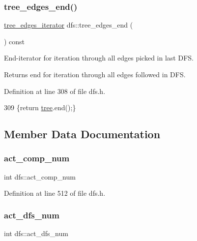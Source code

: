 \subsubsection{\texorpdfstring{tree\+\_\+edges\+\_\+end()}{tree\_edges\_end()}}
{\footnotesize\ttfamily \mbox{\hyperlink{classdfs_accde8d5403404f6d22fe4756d4ffedd5}{tree\+\_\+edges\+\_\+iterator}} dfs\+::tree\+\_\+edges\+\_\+end (\begin{DoxyParamCaption}{ }\end{DoxyParamCaption}) const\hspace{0.3cm}{\ttfamily [inline]}}



End-\/iterator for iteration through all edges picked in last D\+FS. 

\begin{DoxyReturn}{Returns}
end for iteration through all edges followed in D\+FS. 
\end{DoxyReturn}


Definition at line 308 of file dfs.\+h.


\begin{DoxyCode}
309     \{\textcolor{keywordflow}{return} \mbox{\hyperlink{classdfs_aed496b618a937723bfec0b463e17e8d5}{tree}}.end();\}
\end{DoxyCode}


\subsection{Member Data Documentation}
\mbox{\label{classdfs_ab0251ac30adfd569e214a64db7f3a905}} 
\subsubsection{\texorpdfstring{act\+\_\+comp\+\_\+num}{act\_comp\_num}}
{\footnotesize\ttfamily int dfs\+::act\+\_\+comp\+\_\+num\hspace{0.3cm}{\ttfamily [protected]}}



Definition at line 512 of file dfs.\+h.

\mbox{\label{classdfs_aedaf2b485ff83150b1de6c305922473b}} 
\subsubsection{\texorpdfstring{act\+\_\+dfs\+\_\+num}{act\_dfs\_num}}
{\footnotesize\ttfamily int dfs\+::act\+\_\+dfs\+\_\+num\hspace{0.3cm}{\ttfamily [protected]}}




